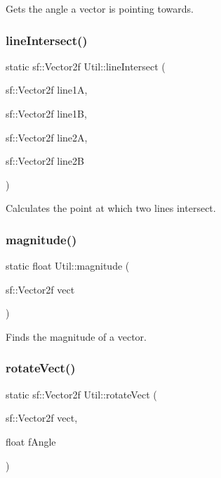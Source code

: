 Gets the angle a vector is pointing towards. 

\mbox{\label{namespace_util_a4f6d91cbe64be4e4297e5ae07a9fb64a}} 
\subsubsection{\texorpdfstring{line\+Intersect()}{lineIntersect()}}
{\footnotesize\ttfamily static sf\+::\+Vector2f Util\+::line\+Intersect (\begin{DoxyParamCaption}\item[{sf\+::\+Vector2f}]{line1A,  }\item[{sf\+::\+Vector2f}]{line1B,  }\item[{sf\+::\+Vector2f}]{line2A,  }\item[{sf\+::\+Vector2f}]{line2B }\end{DoxyParamCaption})\hspace{0.3cm}{\ttfamily [static]}}



Calculates the point at which two lines intersect. 

\mbox{\label{namespace_util_ad4f16b33bef1fb0de0b40a2d01e5ba3d}} 
\subsubsection{\texorpdfstring{magnitude()}{magnitude()}}
{\footnotesize\ttfamily static float Util\+::magnitude (\begin{DoxyParamCaption}\item[{sf\+::\+Vector2f}]{vect }\end{DoxyParamCaption})\hspace{0.3cm}{\ttfamily [static]}}



Finds the magnitude of a vector. 

\mbox{\label{namespace_util_a73745a70851fbb031142c840ad84c48f}} 
\subsubsection{\texorpdfstring{rotate\+Vect()}{rotateVect()}}
{\footnotesize\ttfamily static sf\+::\+Vector2f Util\+::rotate\+Vect (\begin{DoxyParamCaption}\item[{sf\+::\+Vector2f}]{vect,  }\item[{float}]{f\+Angle }\end{DoxyParamCaption})\hspace{0.3cm}{\ttfamily [static]}}



